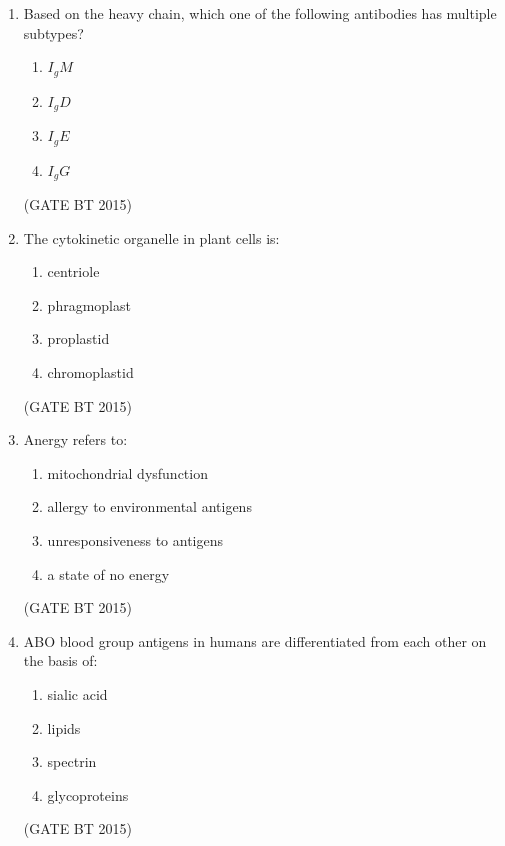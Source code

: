 \documentclass[journal,12pt,onecolumn]{IEEEtran}
\begin{document}
\begin{enumerate}[label=\textbf{Q.\arabic*}]
    \item Based on the heavy chain, which one of the following antibodies has multiple subtypes?
    \begin{multicols}{4}
    \begin{enumerate}
        \item $I_gM$
        \item $I_gD$  
        \item $I_gE$  
        \item $I_gG$  
    \end{enumerate}
    \end{multicols}             \hfill (GATE BT 2015)

    \item The cytokinetic organelle in plant cells is:
    \begin{multicols}{4}
    \begin{enumerate}
        \item centriole  
        \item phragmoplast  
        \item proplastid  
        \item chromoplastid  
    \end{enumerate}
    \end{multicols}             \hfill (GATE BT 2015)


    \item Anergy refers to:
    \begin{multicols}{2}
    \begin{enumerate}
        \item mitochondrial dysfunction  
        \item allergy to environmental antigens  
        \item unresponsiveness to antigens  
        \item a state of no energy  
    \end{enumerate}
    \end{multicols}             \hfill (GATE BT 2015)

    \item ABO blood group antigens in humans are differentiated from each other on the basis of:
    \begin{multicols}{4}
    \begin{enumerate}
        \item sialic acid  
        \item lipids  
        \item spectrin  
        \item glycoproteins  
    \end{enumerate}
    \end{multicols}             \hfill (GATE BT 2015)


\end{enumerate}
\end{document}
